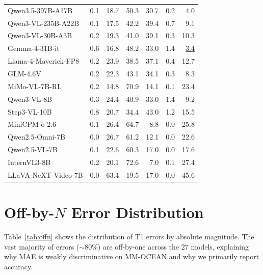\documentclass{article}
\newcommand{\benchname}{MM-OCEAN}
\newcommand{\second}[1]{\underline{#1}}
\begin{document}
\begin{table}[t]
{\begin{tabular}{lrrrrrr}
Qwen3.5-397B-A17B    &  0.1 & 18.7 & 50.3 & 30.7 &  0.2 &   4.0 \\
Qwen3-VL-235B-A22B   &  0.1 & 17.5 & 42.2 & 39.4 &  0.7 &   9.1 \\
Qwen3-VL-30B-A3B     &  0.2 & 19.3 & 41.0 & 39.1 &  0.3 &  10.3 \\
Gemma-4-31B-it       &  0.6 & 16.8 & 48.2 & 33.0 &  1.4 & \second{3.4} \\
Llama-4-Maverick-FP8 &  0.2 & 23.9 & 38.5 & 37.1 &  0.4 &  12.7 \\
GLM-4.6V             &  0.2 & 22.3 & 43.1 & 34.1 &  0.3 &   8.3 \\
MiMo-VL-7B-RL        &  0.2 & 14.8 & 70.9 & 14.1 &  0.1 &  23.4 \\
Qwen3-VL-8B          &  0.3 & 24.4 & 40.9 & 33.0 &  1.4 &   9.2 \\
Step3-VL-10B         &  0.8 & 20.7 & 34.4 & 43.0 &  1.2 &  15.5 \\
MiniCPM-o 2.6        &  0.1 & 26.4 & 64.7 &  8.8 &  0.0 &  25.8 \\
Qwen2.5-Omni-7B      &  0.0 & 26.7 & 61.2 & 12.1 &  0.0 &  22.6 \\
Qwen2.5-VL-7B        &  0.1 & 22.6 & 60.3 & 17.0 &  0.0 &  17.6 \\
InternVL3-8B         &  0.2 & 20.1 & 72.6 &  7.0 &  0.1 &  27.4 \\
LLaVA-NeXT-Video-7B  &  0.0 & 63.4 & 19.5 & 17.0 &  0.0 &  45.6 \\
\bottomrule
\end{tabular}%
}
\end{table}

\section{Off-by-$N$ Error Distribution}
\label{app:offn}
Table~\ref{tab:offn} shows the distribution of T1 errors by absolute magnitude. The vast majority of errors ($\sim\!80\%$) are off-by-one across the 27 models, explaining why MAE is weakly discriminative on \benchname{} and why we primarily report accuracy.
\end{document}
